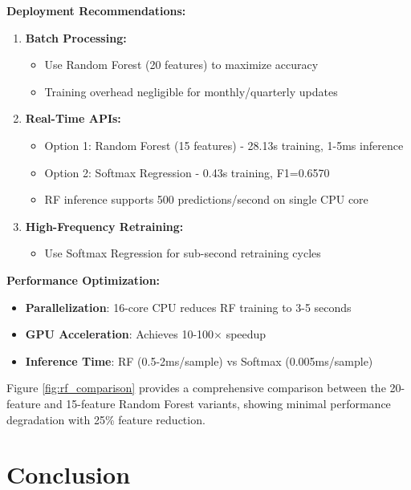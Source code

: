 \documentclass[11pt, a4paper]{article}
\begin{document}
\textbf{Deployment Recommendations:}

\begin{enumerate}
    \item \textbf{Batch Processing:}
    \begin{itemize}
        \item Use Random Forest (20 features) to maximize accuracy
        \item Training overhead negligible for monthly/quarterly updates
    \end{itemize}
    
    \item \textbf{Real-Time APIs:}
    \begin{itemize}
        \item Option 1: Random Forest (15 features) - 28.13s training, 1-5ms inference
        \item Option 2: Softmax Regression - 0.43s training, F1=0.6570
        \item RF inference supports 500 predictions/second on single CPU core
    \end{itemize}
    
    \item \textbf{High-Frequency Retraining:}
    \begin{itemize}
        \item Use Softmax Regression for sub-second retraining cycles
    \end{itemize}
\end{enumerate}

\textbf{Performance Optimization:}

\begin{itemize}
    \item \textbf{Parallelization}: 16-core CPU reduces RF training to 3-5 seconds
    \item \textbf{GPU Acceleration}: Achieves 10-100$\times$ speedup
    \item \textbf{Inference Time}: RF (0.5-2ms/sample) vs Softmax (0.005ms/sample)
\end{itemize}

Figure \ref{fig:rf_comparison} provides a comprehensive comparison between the 20-feature and 15-feature Random Forest variants, showing minimal performance degradation with 25\% feature reduction.

\section{Conclusion}
\end{document}
